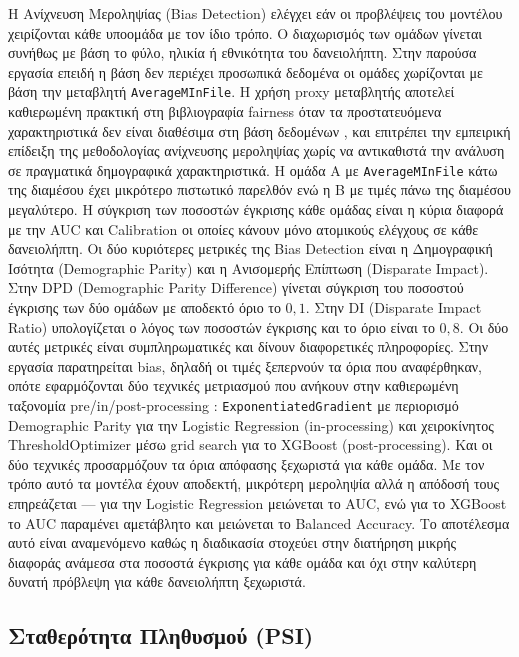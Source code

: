 Η Ανίχνευση Μεροληψίας (Bias Detection) ελέγχει εάν οι προβλέψεις του μοντέλου
χειρίζονται κάθε υποομάδα με τον ίδιο τρόπο. Ο διαχωρισμός των ομάδων γίνεται
συνήθως με βάση το φύλο, ηλικία ή εθνικότητα του δανειολήπτη. Στην παρούσα
εργασία επειδή η βάση δεν περιέχει προσωπικά δεδομένα οι ομάδες χωρίζονται με
βάση την μεταβλητή \texttt{AverageMInFile}. Η χρήση proxy μεταβλητής αποτελεί καθιερωμένη πρακτική στη βιβλιογραφία fairness 
όταν τα προστατευόμενα χαρακτηριστικά δεν είναι διαθέσιμα στη βάση δεδομένων 
\citep{chen2019fairness}, και επιτρέπει την εμπειρική επίδειξη της μεθοδολογίας 
ανίχνευσης μεροληψίας χωρίς να αντικαθιστά την ανάλυση σε πραγματικά 
δημογραφικά χαρακτηριστικά. Η ομάδα Α με
\texttt{AverageMInFile} κάτω της διαμέσου έχει μικρότερο πιστωτικό
παρελθόν ενώ η Β με τιμές πάνω της διαμέσου μεγαλύτερο. Η σύγκριση των ποσοστών
έγκρισης κάθε ομάδας είναι η κύρια διαφορά με την AUC και Calibration οι οποίες
κάνουν μόνο ατομικούς ελέγχους σε κάθε δανειολήπτη. Οι δύο κυριότερες μετρικές
της Bias Detection είναι η Δημογραφική Ισότητα (Demographic Parity) και η
Ανισομερής Επίπτωση (Disparate Impact). Στην DPD (Demographic Parity Difference)
γίνεται σύγκριση του ποσοστού έγκρισης των δύο ομάδων με αποδεκτό όριο το
$0{,}1$. Στην DI (Disparate Impact Ratio) υπολογίζεται ο λόγος των ποσοστών
έγκρισης και το όριο είναι το $0{,}8$. Οι δύο αυτές μετρικές είναι
συμπληρωματικές και δίνουν διαφορετικές πληροφορίες. Στην εργασία παρατηρείται
bias, δηλαδή οι τιμές ξεπερνούν τα όρια που αναφέρθηκαν, οπότε εφαρμόζονται δύο τεχνικές μετριασμού που ανήκουν στην καθιερωμένη ταξονομία 
pre/in/post-processing \citep{kamiran2012data}: \texttt{ExponentiatedGradient} 
\citep{agarwal2018reductions} με περιορισμό Demographic Parity για την Logistic 
Regression (in-processing) και χειροκίνητος ThresholdOptimizer \citep{hardt2016equality} 
μέσω grid search για το XGBoost (post-processing).
Και οι δύο τεχνικές προσαρμόζουν τα όρια απόφασης ξεχωριστά για κάθε ομάδα.
Με τον τρόπο αυτό τα μοντέλα έχουν αποδεκτή, μικρότερη μεροληψία αλλά η
απόδοσή τους επηρεάζεται --- για την Logistic Regression μειώνεται το AUC,
ενώ για το XGBoost το AUC παραμένει αμετάβλητο και μειώνεται το Balanced
Accuracy. Το αποτέλεσμα αυτό είναι αναμενόμενο καθώς η διαδικασία στοχεύει
στην διατήρηση μικρής διαφοράς ανάμεσα στα ποσοστά έγκρισης για κάθε ομάδα
και όχι στην καλύτερη δυνατή πρόβλεψη για κάθε δανειολήπτη ξεχωριστά.

\subsection{Σταθερότητα Πληθυσμού (PSI)}
\label{sec:psi}

